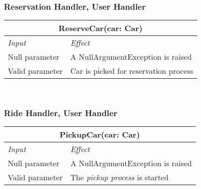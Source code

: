 			\subsubsection*{Reservation Handler, User Handler}
			\begin{tabular}{ |l|l| }
				\hline
				\multicolumn{2}{|c|}{ReserveCar(car: Car)}\\
				\hline
				\textit{Input}&\textit{Effect}\\ \hline
				Null parameter & A NullArgumentException is raised\\ \hline
				Valid parameter & Car is picked for reservation process \\ \hline
			\end{tabular}
			\\
			
			\subsubsection*{Ride Handler, User Handler}
			\begin{tabular}{ |l|l| }
				\hline
				\multicolumn{2}{|c|}{PickupCar(car: Car)}\\
				\hline
				\textit{Input}&\textit{Effect}\\ \hline
				Null parameter & A NullArgumentException is raised\\ \hline
				Valid parameter & The \textit{pickup process} is started \\ \hline
			\end{tabular}
			\\	
			
